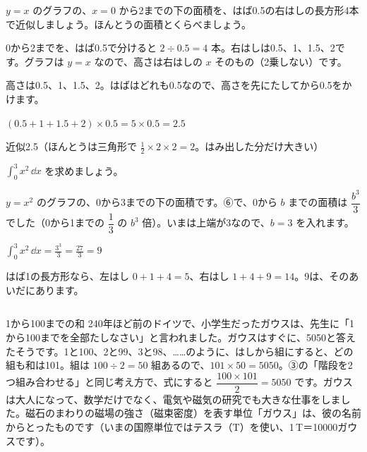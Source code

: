 \begin{reidai}[長方形の和で近似する]
$y=x$ のグラフの、$x=0$ から2までの下の面積を、はば0.5の右はしの長方形4本で近似しましょう。ほんとうの面積とくらべましょう。\par
\kangaekata 0から2までを、はば0.5で分けると $2\div0.5=4$ 本。右はしは0.5、1、1.5、2です。グラフは $y=x$ なので、高さは右はしの $x$ そのもの（2乗しない）です。\par
\shiki 高さは0.5、1、1.5、2。はばはどれも0.5なので、高さを先にたしてから0.5をかけます。\par
\hspace*{2.6\zw}$(0.5+1+1.5+2)\times0.5=5\times0.5=2.5$\par
\kotae 近似2.5（ほんとうは三角形で $\frac{1}{2}\times2\times2=2$。はみ出した分だけ大きい）
\end{reidai}

\begin{reidai}[$x^2$ の定積分]
$\displaystyle\int_0^3x^2\,\dd x$ を求めましょう。\par
\kangaekata $y=x^2$ のグラフの、0から3までの下の面積です。⑥で、0から $b$ までの面積は $\dfrac{b^3}{3}$ でした（0から1までの $\dfrac{1}{3}$ の $b^3$ 倍）。いまは上端が3なので、$b=3$ を入れます。\par
\shiki $\displaystyle\int_0^3x^2\,\dd x=\frac{3^3}{3}=\frac{27}{3}=9$\par
{}はば1の長方形なら、左はし $0+1+4=5$、右はし $1+4+9=14$。9は、そのあいだにあります。\par
{}
\end{reidai}

\begin{column}{1から100までの和}
240年ほど前のドイツで、小学生だったガウスは、先生に「1から100までを全部たしなさい」と言われました。ガウスはすぐに、5050と答えたそうです。1と100、2と99、3と98、……のように、はしから組にすると、どの組も和は101。組は $100\div2=50$ 組あるので、$101\times50=5050$。③の「階段を2つ組み合わせる」と同じ考え方で、式にすると $\dfrac{100\times101}{2}=5050$ です。ガウスは大人になって、数学だけでなく、電気や磁気の研究でも大きな仕事をしました。磁石のまわりの磁場の強さ（磁束密度）を表す単位「ガウス」は、彼の名前からとったものです（いまの国際単位ではテスラ（T）を使い、1\,T＝10000ガウスです）。
\end{column}

